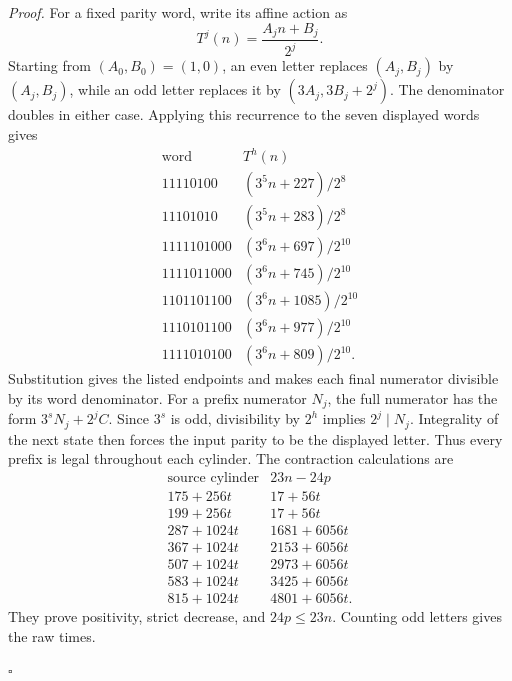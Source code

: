 \documentclass[11pt,letterpaper]{article}
\newenvironment{proof}{\noindent\textit{Proof.}}{\hfill\(\square\)}
\begin{document}
\begin{proof}
For a fixed parity word, write its affine action as
\[
T^j(n)=\frac{A_jn+B_j}{2^j}.
\]
Starting from \((A_0,B_0)=(1,0)\), an even letter replaces
\((A_j,B_j)\) by \((A_j,B_j)\), while an odd letter replaces it by
\((3A_j,3B_j+2^j)\). The denominator doubles in either case. Applying this
recurrence to the seven displayed words gives
\[
\begin{array}{c|c}
\text{word}&T^h(n)\\ \hline
11110100&(3^5n+227)/2^8\\
11101010&(3^5n+283)/2^8\\
1111101000&(3^6n+697)/2^{10}\\
1111011000&(3^6n+745)/2^{10}\\
1101101100&(3^6n+1085)/2^{10}\\
1110101100&(3^6n+977)/2^{10}\\
1111010100&(3^6n+809)/2^{10}.
\end{array}
\]
Substitution gives the listed endpoints and makes each final numerator
divisible by its word denominator. For a prefix numerator \(N_j\), the full
numerator has the form \(3^sN_j+2^jC\). Since \(3^s\) is odd, divisibility
by \(2^h\) implies \(2^j\mid N_j\). Integrality of the next state then
forces the input parity to be the displayed letter. Thus every prefix is legal
throughout each cylinder. The contraction calculations are
\[
\begin{array}{c|c}
\text{source cylinder}&23n-24p\\ \hline
175+256t&17+56t\\
199+256t&17+56t\\
287+1024t&1681+6056t\\
367+1024t&2153+6056t\\
507+1024t&2973+6056t\\
583+1024t&3425+6056t\\
815+1024t&4801+6056t.
\end{array}
\]
They prove positivity, strict decrease, and \(24p\le23n\). Counting odd
letters gives the raw times.


\end{proof}
\end{document}
